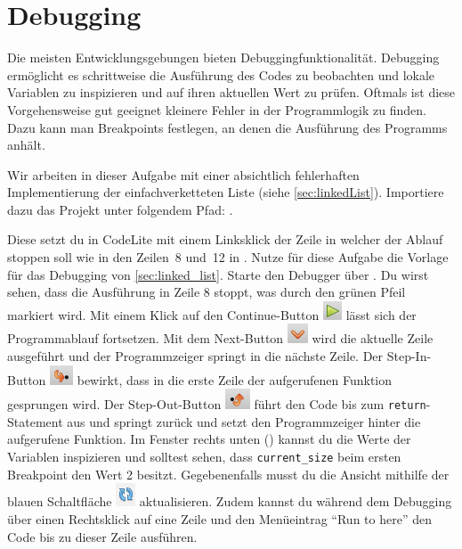 \section{\ExercisePrefixMemory Debugging \optional}\label{sec:debugging}
\optionaltextbox

Die meisten Entwicklungsgebungen bieten Debuggingfunktionalität.
Debugging ermöglicht es schrittweise die Ausführung des Codes zu beobachten und lokale Variablen zu inspizieren und auf ihren aktuellen Wert zu prüfen. Oftmals ist diese Vorgehensweise gut geeignet kleinere Fehler in der Programmlogik zu finden.
Dazu kann man Breakpoints festlegen, an denen die Ausführung des Programms anhält.

Wir arbeiten in dieser Aufgabe mit einer absichtlich fehlerhaften Implementierung der einfachverketteten Liste (siehe \ref{sec:linkedList}).
Importiere dazu das Projekt unter folgendem Pfad: .

Diese setzt du in CodeLite mit einem Linksklick der Zeile in welcher der Ablauf stoppen soll wie in den Zeilen~8 und~12 in . 
Nutze für diese Aufgabe die Vorlage für das Debugging von \ref{sec:linked_list}. Starte den Debugger über .
Du wirst sehen, dass die Ausführung in Zeile 8 stoppt, was durch den grünen Pfeil markiert wird. 
Mit einem Klick auf den Continue-Button \includegraphics[height=1.5ex]{02_memory/figures/continueButton.png} lässt sich der Programmablauf fortsetzen.
Mit dem Next-Button  \includegraphics[height=1.5ex]{02_memory/figures/stepOverButton.png} wird die aktuelle Zeile ausgeführt und der Programmzeiger springt in die nächste Zeile.
Der Step-In-Button \includegraphics[height=1.5ex]{02_memory/figures/stepInButton.png} bewirkt, dass in die erste Zeile der aufgerufenen Funktion gesprungen wird.
Der Step-Out-Button  \includegraphics[height=1.5ex]{02_memory/figures/stepOutButton.png} führt den Code bis zum \lstinline|return|-Statement aus und springt zurück und setzt den Programmzeiger hinter die aufgerufene Funktion.
Im Fenster rechts unten () kannst du die Werte der Variablen inspizieren und solltest sehen, dass \lstinline|current_size| beim ersten Breakpoint den Wert 2 besitzt.
Gegebenenfalls musst du die Ansicht mithilfe der blauen Schaltfläche \includegraphics[height=1.5ex]{02_memory/figures/updateLocalsButton.png} aktualisieren.
Zudem kannst du während dem Debugging über einen Rechtsklick auf eine Zeile und den Menüeintrag \enquote{Run to here} den Code bis zu dieser Zeile ausführen.
 
